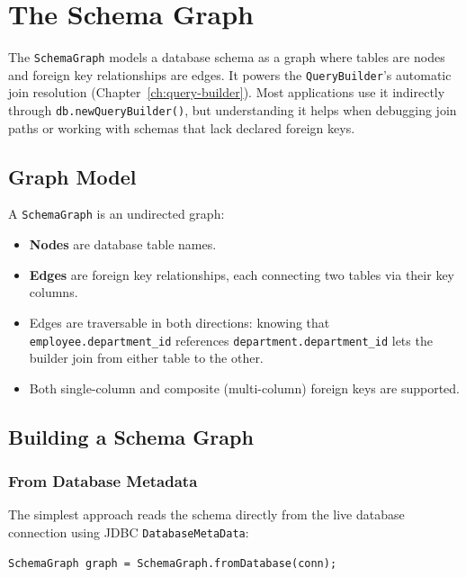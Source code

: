 \chapter{The Schema Graph}
\label{ch:schema-graph}

The \texttt{SchemaGraph} models a database schema as a graph where tables are nodes and foreign key relationships are edges.  It powers the \texttt{QueryBuilder}'s automatic join resolution (Chapter~\ref{ch:query-builder}).  Most applications use it indirectly through \texttt{db.newQueryBuilder()}, but understanding it helps when debugging join paths or working with schemas that lack declared foreign keys.

\section{Graph Model}
\label{sec:sg-model}

A \texttt{SchemaGraph} is an undirected graph:

\begin{itemize}
  \item \textbf{Nodes} are database table names.
  \item \textbf{Edges} are foreign key relationships, each connecting two tables via their key columns.
  \item Edges are traversable in both directions: knowing that \texttt{employee.department\_id} references \texttt{department.department\_id} lets the builder join from either table to the other.
  \item Both single-column and composite (multi-column) foreign keys are supported.
\end{itemize}

\section{Building a Schema Graph}
\label{sec:sg-building}

\subsection{From Database Metadata}

The simplest approach reads the schema directly from the live database connection using JDBC \texttt{DatabaseMetaData}:

\begin{lstlisting}[style=java]
SchemaGraph graph = SchemaGraph.fromDatabase(conn);
\end{lstlisting}

